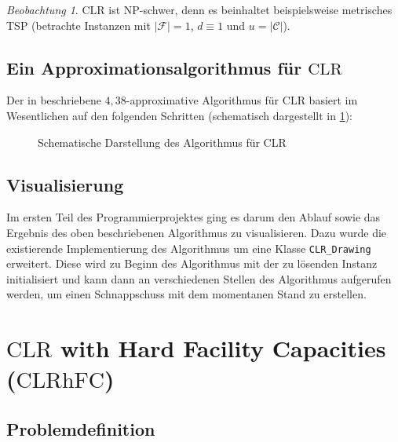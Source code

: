 \documentclass[a4paper,ngerman,12pt,bibtotoc]{scrartcl}
\theoremstyle{definition}
\theoremstyle{plain}
\theoremstyle{remark}
\newtheorem{beob}[defn]{Beobachtung}
\newcommand{\ClientSet}{\mathscr{C}}
\newcommand{\FacilitySet}{\mathscr{F}}
\newcommand{\CLR}{\mathrm{CLR}}
\newcommand{\CLRHFC}{\mathrm{CLRhFC}}
\begin{document}
\begin{beob}
	$\CLR{}$ ist NP-schwer, denn es beinhaltet beispielsweise metrisches TSP (betrachte Instanzen mit $|\FacilitySet| = 1$, $d \equiv 1$ und $u = |\ClientSet|$).
\end{beob}


	\subsection{Ein Approximationsalgorithmus für $\CLR$}

Der in \cite{AAfCLR} beschriebene $4,38$-approximative Algorithmus für $\CLR$ basiert im Wesentlichen auf den folgenden Schritten (schematisch dargestellt in \cref{fig:CLRAlg}):



\begin{figure}[H]
	\begin{tiny}
		
	\end{tiny}
	\caption{Schematische Darstellung des Algorithmus für CLR}\label{fig:CLRAlg}
\end{figure}

\subsection{Visualisierung}

Im ersten Teil des Programmierprojektes ging es darum den Ablauf sowie das Ergebnis des oben beschriebenen Algorithmus zu visualisieren. Dazu wurde die existierende Implementierung des Algorithmus um eine Klasse \texttt{CLR\_Drawing} erweitert. Diese wird zu Beginn des Algorithmus mit der zu lösenden Instanz initialisiert und kann dann an verschiedenen Stellen des Algorithmus aufgerufen werden, um einen Schnappschuss mit dem momentanen Stand zu erstellen. 


	

\section{$\CLR$ with Hard Facility Capacities ($\CLRHFC$)}

	\subsection{Problemdefinition}
\end{document}
